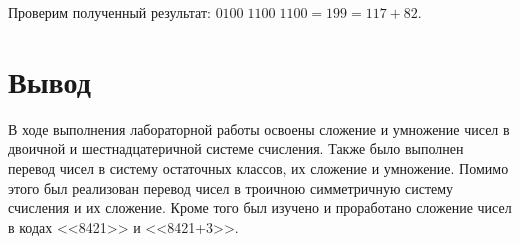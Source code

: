 \documentclass[a4paper,14pt]{extarticle}
\begin{document}
  Проверим полученный результат: $0100\;1100\;1100=199=117+82$.

  \section*{Вывод}
  В ходе выполнения лабораторной работы освоены сложение и умножение чисел в двоичной и шестнадцатеричной системе счисления. Также было выполнен перевод чисел в систему остаточных классов, их сложение и умножение. Помимо этого был реализован перевод чисел в троичною симметричную систему счисления и их сложение. Кроме того был изучено и проработано сложение чисел в кодах <<8421>> и <<8421+3>>.
\end{document}
